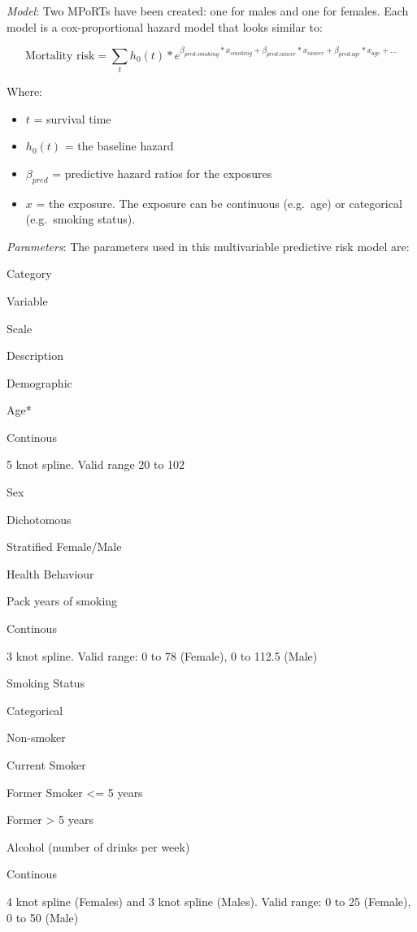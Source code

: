 \documentclass[]{book}
\providecommand{\tightlist}{%
  \setlength{\itemsep}{0pt}\setlength{\parskip}{0pt}}
\begin{document}
\emph{Model}: Two MPoRTs have been created: one for males and one for
females. Each model is a cox-proportional hazard model that looks
similar to:

\[ \text{Mortality risk} = \sum_t h_0(t) * e^{\beta_{pred.smoking}*x_{smoking}+\beta_{pred.cancer}*x_{cancer} + \beta_{pred.age}*x_{age} +...}  \]

Where:

\begin{itemize}
\tightlist
\item
  \(t\) = survival time
\item
  \(h_0(t)\) = the baseline hazard
\item
  \(\beta_{pred}\) = predictive hazard ratios for the exposures
\item
  \(x\) = the exposure. The exposure can be continuous (e.g.~age) or
  categorical (e.g.~smoking status).
\end{itemize}

\emph{Parameters}: The parameters used in this multivariable predictive
risk model are:

Category

Variable

Scale

Description

Demographic

Age*

Continous

5 knot spline. Valid range 20 to 102

Sex

Dichotomous

Stratified Female/Male

Health Behaviour

Pack years of smoking

Continous

3 knot spline. Valid range: 0 to 78 (Female), 0 to 112.5 (Male)

Smoking Status

Categorical

Non-smoker

Current Smoker

Former Smoker \textless{}= 5 years

Former \textgreater{} 5 years

Alcohol (number of drinks per week)

Continous

4 knot spline (Females) and 3 knot spline (Males). Valid range: 0 to 25
(Female), 0 to 50 (Male)
\end{document}
